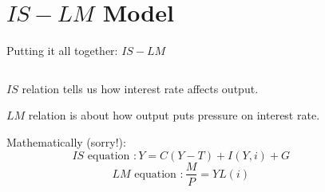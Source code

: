 \documentclass[shownotes,11pt, aspectratio=169]{beamer}
\newenvironment{wideitemize}{\itemize\addtolength{\itemsep}{10pt}}{\enditemize}
\begin{document}
\section{$IS-LM$ Model}
\begin{frame}{Putting it all together: $IS-LM$}
\begin{columns}[T] %
\begin{column}{.44\textwidth}
  \begin{wideitemize}
   \item $IS$ relation tells us \pause how \textcolor{red!80}{interest rate affects output}.
   \item $LM$ relation is about \pause how \textcolor{green!80}{output puts pressure on interest rate}. \pause
   \item Mathematically (sorry!):
         \[ IS \text{ equation }:  Y = C(Y - T) + I(Y, i) + G \]
         \[ LM \text{ equation }:  \frac{M}{P} = YL(i) \]
  \end{wideitemize}
\end{column}%
\pause
\hfill%
\begin{column}{.53\textwidth}
\end{column}%
\end{columns}
\end{frame}
\end{document}
